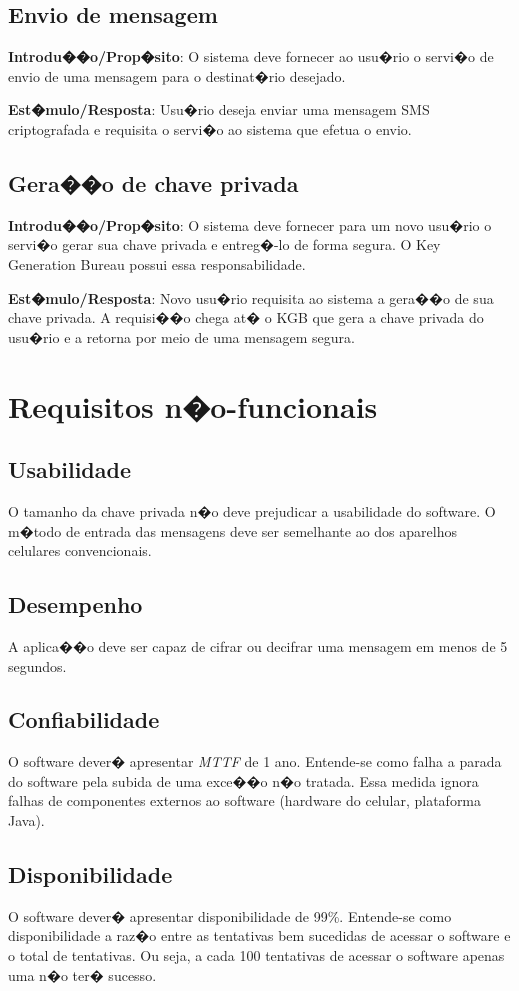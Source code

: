 \documentclass[a4paper,capchap,espacoduplo,normaltoc]{abntepusp}
\begin{document}
\subsection{Envio de mensagem}
\textbf{Introdu��o/Prop�sito}: O sistema deve fornecer ao usu�rio o servi�o de envio de uma mensagem para o destinat�rio desejado.
	
\textbf{Est�mulo/Resposta}: Usu�rio deseja enviar uma mensagem SMS criptografada e requisita o servi�o ao sistema que efetua o envio.


\subsection{Gera��o de chave privada}
\textbf{Introdu��o/Prop�sito}: O sistema deve fornecer para um novo usu�rio o servi�o gerar sua chave privada e entreg�-lo de forma segura. O Key Generation Bureau possui essa responsabilidade.
	
\textbf{Est�mulo/Resposta}: Novo usu�rio requisita ao sistema a gera��o de sua chave privada. A requisi��o chega at� o KGB que gera a chave privada do usu�rio
 e a retorna por meio de uma mensagem segura.

\section{Requisitos n�o-funcionais}
\subsection{Usabilidade}
O tamanho da chave privada n�o deve prejudicar a usabilidade do software. O m�todo de entrada das mensagens deve ser semelhante ao dos aparelhos celulares convencionais.
\subsection{Desempenho}
A aplica��o deve ser capaz de cifrar ou decifrar uma mensagem em menos de 5 segundos.
\subsection{Confiabilidade}
O software dever� apresentar \emph{MTTF} de 1 ano. Entende-se como falha a parada do software pela subida de uma exce��o n�o tratada. Essa medida ignora falhas de componentes externos ao software (hardware do celular, plataforma Java).
\subsection{Disponibilidade}
O software dever� apresentar disponibilidade de 99\%. Entende-se como disponibilidade a raz�o entre as tentativas bem sucedidas de acessar o software e o total de tentativas. Ou seja, a cada 100 tentativas de acessar o software apenas uma n�o ter� sucesso.
\end{document}
